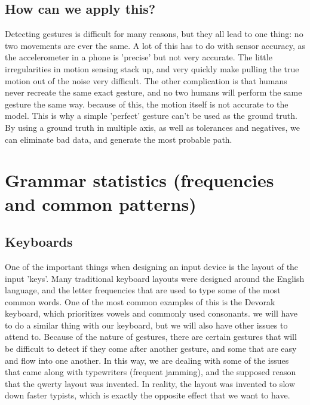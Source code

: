 \documentclass[onecolumn, draftclsnofoot,10pt, journal, letterpaper]{IEEEtran}
\begin{document}
    \subsection{How can we apply this?}
    Detecting gestures is difficult for many reasons, but they all lead to one thing: no two movements are ever the same. A lot of this has to do with sensor accuracy, as the accelerometer in a phone is 'precise' but not very accurate. The little irregularities in motion sensing stack up, and very quickly make pulling the true motion out of the noise very difficult. The other complication is that humans never recreate the same exact gesture, and no two humans will perform the same gesture the same way. because of this, the motion itself is not accurate to the model. This is why a simple 'perfect' gesture can't be used as the ground truth. By using a ground truth in multiple axis, as well as tolerances and negatives, we can eliminate bad data, and generate the most probable path.

\section{Grammar statistics (frequencies and common patterns)}
    \subsection{Keyboards}
    One of the important things when designing an input device is the layout of the input 'keys'. Many traditional keyboard layouts were designed around the English language, and the letter frequencies that are used to type some of the most common words. One of the most common examples of this is the Devorak keyboard, which prioritizes vowels and commonly used consonants. \cite{randy_cassingham_dvorak_2019} we will have to do a similar thing with our keyboard, but we will also have other issues to attend to. Because of the nature of gestures, there are certain gestures that will be difficult to detect if they come after another gesture, and some that are easy and flow into one another. In this way, we are dealing with some of the issues that came along with typewriters (frequent jamming), and the supposed reason that the qwerty layout was invented. In reality, the layout was invented to slow down faster typists, which is exactly the opposite effect that we want to have. \cite{leah_welborn_why_2011}\par
\end{document}
